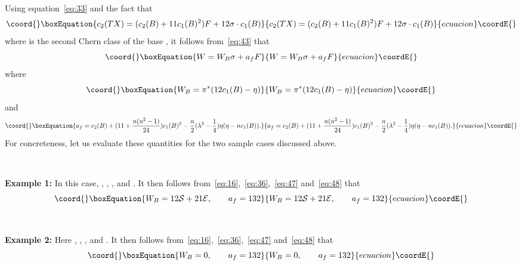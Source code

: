 \documentclass[a4paper,12pt]{article}
\numberwithin{equation}{section}
\def\cE{{\mathcal E}}
\def\cS{{\mathcal S}}
\theoremstyle{plain}
\begin{document}
Using equation~\eqref{eq:33} and the fact that
\begin{equation}\coord{}\boxEquation{
c_{2}(TX)=(c_{2}(B)+11c_{1}(B)^{2})F +12\sigma\cdot c_{1}(B)
\label{eq:45}
}{
c_{2}(TX)=(c_{2}(B)+11c_{1}(B)^{2})F +12\sigma\cdot c_{1}(B)
}{ecuacion}\coordE{}\end{equation}
where \coordHE{} is the second Chern class of the base \coordHE{}, 
it follows from~\eqref{eq:43} that
\begin{equation}\coord{}\boxEquation{
W=W_{B}\sigma +a_{f}F
\label{eq:46}
}{
W=W_{B}\sigma +a_{f}F
}{ecuacion}\coordE{}\end{equation}
where
\begin{equation}\coord{}\boxEquation{
W_{B}=\pi^{*}(12c_{1}(B)-\eta)
\label{eq:47}
}{
W_{B}=\pi^{*}(12c_{1}(B)-\eta)
}{ecuacion}\coordE{}\end{equation}
and
\begin{equation}\coord{}\boxEquation{
a_{f}=c_{2}(B)+(11+\frac{n(n^{2}-1)}{24})c_{1}(B)^{2}-\frac{n}{2}
(\lambda^{2}-\frac{1}{4})\eta(\eta-nc_{1}(B)).
\label{eq:48}
}{
a_{f}=c_{2}(B)+(11+\frac{n(n^{2}-1)}{24})c_{1}(B)^{2}-\frac{n}{2}
(\lambda^{2}-\frac{1}{4})\eta(\eta-nc_{1}(B)).
}{ecuacion}\coordE{}\end{equation}
For concreteness, let us evaluate these quantities for the two sample cases
discussed above.

\smallskip

\

\noindent
{\bf Example 1:} \quad In this case, \coordHE{}, \coordHE{}, \coordHE{}, 
\myHighlight{$\eta=12\cS+15\cE$}\coordHE{} and
\coordHE{}. It then follows
from~\eqref{eq:16},~\eqref{eq:36},~\eqref{eq:47} and~\eqref{eq:48} that 
\begin{equation}\coord{}\boxEquation{
W_{B}=12\cS+21\cE, \qquad a_{f}=132
\label{eq:49}
}{
W_{B}=12\cS+21\cE, \qquad a_{f}=132
}{ecuacion}\coordE{}\end{equation}


\smallskip

\

\noindent
{\bf Example 2:} \quad Here \coordHE{}, \coordHE{}, \coordHE{}, 
\myHighlight{$\eta=24\cS+36\cE$}\coordHE{} and
\coordHE{}. It then follows
from~\eqref{eq:16},~\eqref{eq:36},~\eqref{eq:47} and~\eqref{eq:48} that 
\begin{equation}\coord{}\boxEquation{
W_{B}=0, \qquad a_{f}=132
\label{eq:50}
}{
W_{B}=0, \qquad a_{f}=132
}{ecuacion}\coordE{}\end{equation}
\end{document}
